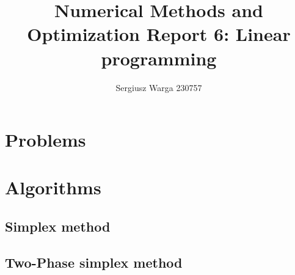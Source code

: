 \documentclass[a4paper]{article}
\title{Numerical Methods and Optimization Report 6:
  Linear programming}
\author{Sergiusz Warga 230757}
\date{}
\begin{document}
\maketitle
\tableofcontents
\pagebreak

\section{Problems}



\clearpage

\section{Algorithms}
\label{sec:algorithms}
\subsection{Simplex method}%
\label{alg:simplex}

\subsection{Two-Phase simplex method}%
\label{alg:two-phase-simplex}


\nocite{Meyer, GoluVanl96, Zdunek}


\end{document}
